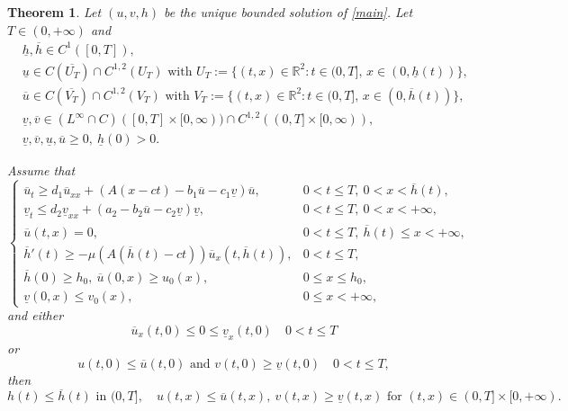 \documentclass[10pt,a4paper]{amsart}
\newtheorem{theorem}{Theorem}
\begin{document}
	\begin{theorem}\label{th:comparison}
		Let $(u,v,h)$ be the unique bounded solution of \eqref{main}. Let $T \in (0,+\infty)$ and
		\begin{align*}
			&\underline{h}, \overline{h} \in C^1([0,T]),\\
			&\underline{u} \in C(\overline{U_T}) \cap C^{1,2}(U_T)
			\text{ with } U_T := \{ (t,x) \in \mathbb{R}^2 : t \in (0, T],\, x \in (0, \underline{h}(t))\},\\
			&\overline{u} \in C(\overline{V_T}) \cap C^{1,2}(V_T)
			\text{ with } V_T := \{ (t,x) \in \mathbb{R}^2 : t \in (0, T],\, x \in (0, \overline{h}(t))\},\\
			&\underline{v}, \overline{v}
			\in (L^{\infty} \cap C)([0,T] \times [0,\infty))
			\cap C^{1,2}((0,T] \times [0,\infty)),\\
			&\underline{v}, \overline{v}, \underline{u}, \overline{u} \ge 0,
			~ \underline{h}(0) > 0.
		\end{align*}
		
		Assume that
		\[
		\begin{cases}
			\overline{u}_t \ge d_1\overline{u}_{xx}
			+ (A(x - ct) - b_1\overline{u} - c_1 \underline{v}) \overline{u},
			& 0 < t \le T,~ 0 < x < \overline{h}(t), \\
			\underline{v}_t \le d_2\underline{v}_{xx}
			+ (a_2 - b_2\overline{u} - c_2\underline{v})\underline{v},
			& 0 < t \le T,~ 0 < x < +\infty, \\
			\overline{u}(t, x) = 0,
			& 0 < t \le T, ~ \overline{h}(t) \leq x < +\infty, \\
			\overline{h}'(t) \ge -\mu (A(\overline{h}(t) - ct))\overline{u}_x(t, \overline{h}(t)),
			& 0 < t \le T, \\
			\overline{h}(0) \ge h_0,~ \overline{u}(0, x) \ge u_0(x),
			& 0 \leq x \leq h_0, \\
			\underline{v}(0, x) \le v_0(x),
			& 0 \le x < +\infty,
		\end{cases}
		\]
		and either
		\[
		\overline{u}_x(t, 0) \le 0 \le \underline{v}_x(t, 0) \quad 0 < t \le T
		\]
		or
		\[
		u(t,0) \le \overline{u}(t,0) \text{ and } v(t,0) \ge \underline{v}(t,0)  \quad 0 < t \le T,
		\]
		then
		\[
		h(t) \le \overline{h}(t) \text{ in } (0,T],\quad
		u(t,x) \le \overline{u}(t,x),~ v(t,x) \ge \underline{v}(t,x)
		\text{ for } (t,x) \in (0,T] \times [0,+\infty).
		\]
		

\end{theorem}
\end{document}
